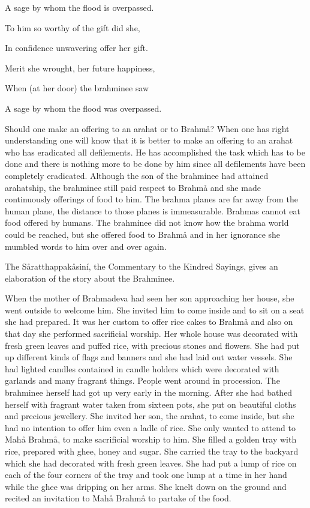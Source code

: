 \documentclass[12pt,twoside]{article}
\begin{document}
A sage by whom the flood is overpassed. 

To him so worthy of the gift did she, 

In confidence unwavering offer her gift. 

Merit she wrought, her future happiness, 

When (at her door) the brahminee saw

A sage by whom the flood was overpassed. 


\bigskip

Should one make an offering to an arahat or to Brahm{\aa}? When one has
right understanding one will know that it is better to make an offering
to an arahat who has eradicated all defilements. He has accomplished
the task which has to be done and there is nothing more to be done by
him since all defilements have been completely eradicated. Although the
son of the brahminee had attained arahatship, the brahminee still paid
respect to Brahm{\aa} and she made continuously offerings of food to
him. The brahma planes are far away from the human plane, the distance
to those planes is immeasurable. Brahmas cannot eat food offered by
humans. The brahminee did not know how the brahma world could be
reached, but she offered food to Brahm{\aa} and in her ignorance she
mumbled words to him over and over again. 

The S{\aa}ratthappak{\aa}sin\'i, the Commentary to the Kindred Sayings,
gives an elaboration of the story about the Brahminee. 


\bigskip

When the mother of Brahmadeva had seen her son approaching her house,
she went outside to welcome him. She invited him to come inside and to
sit on a seat she had prepared. It was her custom to offer rice cakes
to Brahm{\aa} and also on that day she performed sacrificial worship.
Her whole house was decorated with fresh green leaves and puffed rice,
with precious stones and flowers. She had put up different kinds of
flags and banners and she had laid out water vessels. She had lighted
candles contained in candle holders which were decorated with garlands
and many fragrant things. People went around in procession. The
brahminee herself had got up very early in the morning. After she had
bathed herself with fragrant water taken from sixteen pots, she put on
beautiful cloths and precious jewellery. She invited her son, the
arahat, to come inside, but she had no intention to offer him even a
ladle of rice. She only wanted to attend to Mah{\aa} Brahm{\aa}, to
make sacrificial worship to him. She filled a golden tray with rice,
prepared with ghee, honey and sugar. She carried the tray to the
backyard which she had decorated with fresh green leaves. She had put a
lump of rice on each of the four corners of the tray and took one lump
at a time in her hand while the ghee was dripping on her arms. She
knelt down on the ground and recited an invitation to Mah{\aa}
Brahm{\aa} to partake of the food. 
\end{document}
